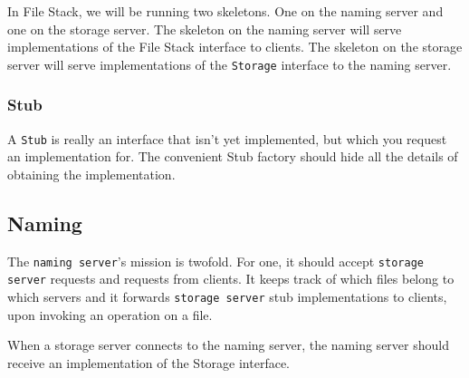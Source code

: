 \documentclass [10pt, a4paper]{article}
\begin{document}
In File Stack, we will be running two skeletons. One on the naming server and
one on the storage server. The skeleton on the naming server will serve
implementations of the File Stack interface to clients. The skeleton on the
storage server will serve implementations of the \texttt{Storage} interface to
the naming server.

\subsubsection {Stub}
A \texttt{Stub} is really an interface that isn't yet implemented, but which you
request an implementation for. The convenient Stub factory should hide all the
details of obtaining the implementation.

\subsection {Naming}
The \texttt{naming server}'s mission is twofold. For one, it should accept
\texttt{storage server}
requests and requests from clients. It keeps track of which files belong to
which servers and it forwards \texttt{storage server} stub
implementations to clients, upon invoking an operation on a file.

When a storage server connects to the naming server, the naming server should
receive an implementation of the Storage interface.
\end{document}
